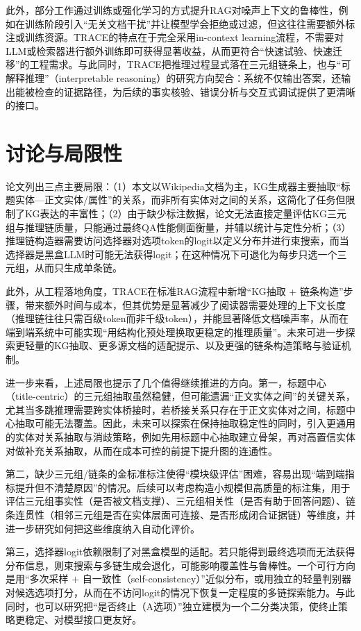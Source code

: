 此外，部分工作通过训练或强化学习的方式提升RAG对噪声上下文的鲁棒性，例如在训练阶段引入“无关文档干扰”并让模型学会拒绝或过滤，但这往往需要额外标注或训练资源。TRACE的特点在于完全采用in-context learning流程，不需要对LLM或检索器进行额外训练即可获得显著收益，从而更符合“快速试验、快速迁移”的工程需求。与此同时，TRACE把推理过程显式落在三元组链条上，也与“可解释推理”（interpretable reasoning）的研究方向契合：系统不仅输出答案，还输出能被检查的证据路径，为后续的事实核验、错误分析与交互式调试提供了更清晰的接口。

\section{讨论与局限性}
论文列出三点主要局限：（1）本文以Wikipedia文档为主，KG生成器主要抽取“标题实体—正文实体/属性”的关系，而非所有实体对之间的关系，这简化了任务但限制了KG表达的丰富性；（2）由于缺少标注数据，论文无法直接定量评估KG三元组与推理链质量，只能通过最终QA性能侧面衡量，并辅以统计与定性分析；（3）推理链构造器需要访问选择器对选项token的logit以定义分布并进行束搜索，而当选择器是黑盒LLM时可能无法获得logit；在这种情况下可退化为每步只选一个三元组，从而只生成单条链。

此外，从工程落地角度，TRACE在标准RAG流程中新增“KG抽取 + 链条构造”步骤，带来额外时间与成本，但其优势是显著减少了阅读器需要处理的上下文长度（推理链往往只需百级token而非千级token），并能显著降低文档噪声率，从而在端到端系统中可能实现“用结构化预处理换取更稳定的推理质量”。未来可进一步探索更轻量的KG抽取、更多源文档的适配提示、以及更强的链条构造策略与验证机制。

进一步来看，上述局限也提示了几个值得继续推进的方向。第一，标题中心（title-centric）的三元组抽取虽然稳健，但可能遗漏“正文实体之间”的关键关系，尤其当多跳推理需要跨实体桥接时，若桥接关系只存在于正文实体对之间，标题中心抽取可能无法覆盖。因此，未来可以探索在保持抽取稳定性的同时，引入更通用的实体对关系抽取与消歧策略，例如先用标题中心抽取建立骨架，再对高置信实体对做补充关系抽取，从而在成本可控的前提下提升图的连通性。

第二，缺少三元组/链条的金标准标注使得“模块级评估”困难，容易出现“端到端指标提升但不清楚原因”的情况。后续可以考虑构造小规模但高质量的标注集，用于评估三元组事实性（是否被文档支撑）、三元组相关性（是否有助于回答问题）、链条连贯性（相邻三元组是否在实体层面可连接、是否形成闭合证据链）等维度，并进一步研究如何把这些维度纳入自动化评价。

第三，选择器logit依赖限制了对黑盒模型的适配。若只能得到最终选项而无法获得分布信息，则束搜索与多链生成会退化，可能影响覆盖性与鲁棒性。一个可行方向是用“多次采样 + 自一致性（self-consistency）”近似分布，或用独立的轻量判别器对候选选项打分，从而在不访问logit的情况下恢复一定程度的多链探索能力。与此同时，也可以研究把“是否终止（A选项）”独立建模为一个二分类决策，使终止策略更稳定、对模型接口更友好。

